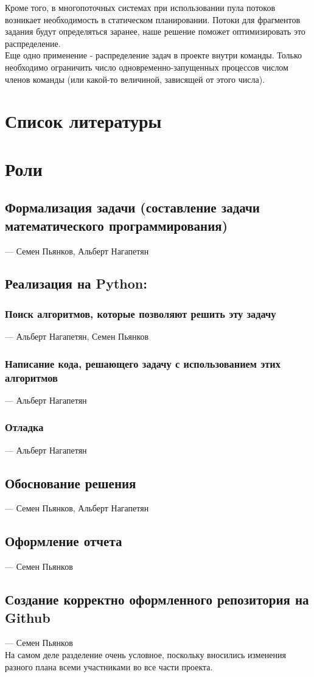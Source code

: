 \documentclass{article}
\begin{document}
Кроме того, в многопоточных системах при использовании пула потоков возникает необходимость в статическом планировании. Потоки для фрагментов задания будут определяться заранее, наше решение поможет оптимизировать это распределение.\\

Еще одно применение - распределение задач в проекте внутри команды. Только необходимо ограничить число одновременно-запущенных процессов числом членов команды (или какой-то величиной, зависящей от этого числа).\\


\section{Список литературы}


\section{Роли}

\subsection{Формализация задачи (составление задачи математического программирования)} --- Семен Пьянков, Альберт Нагапетян
\subsection{Реализация на Python:}
    \subsubsection{Поиск алгоритмов, которые позволяют решить эту задачу} --- Альберт Нагапетян, Семен Пьянков
    \subsubsection{Написание кода, решающего задачу с использованием этих алгоритмов} --- Альберт Нагапетян
    \subsubsection{Отладка} --- Альберт Нагапетян %
\subsection{Обоснование решения} --- Семен Пьянков, Альберт Нагапетян
\subsection{Оформление отчета} --- Семен Пьянков
\subsection{Создание корректно оформленного репозитория на Github} --- Семен Пьянков\\

На самом деле разделение очень условное, поскольку вносились изменения разного плана всеми участниками во все части проекта.\\
\end{document}
